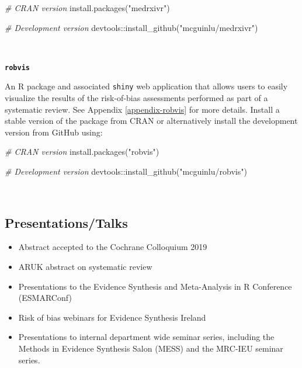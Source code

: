 \documentclass[a4paper, twoside]{templates/ociamthesis}
\providecommand{\tightlist}{%
  \setlength{\itemsep}{0pt}\setlength{\parskip}{0pt}}
\newenvironment{Shaded}{\begin{snugshade}}{\end{snugshade}}
\newcommand{\CommentTok}[1]{\textcolor[rgb]{0.56,0.35,0.01}{\textit{#1}}}
\newcommand{\FunctionTok}[1]{\textcolor[rgb]{0.00,0.00,0.00}{#1}}
\newcommand{\NormalTok}[1]{#1}
\newcommand{\SpecialCharTok}[1]{\textcolor[rgb]{0.00,0.00,0.00}{#1}}
\newcommand{\StringTok}[1]{\textcolor[rgb]{0.31,0.60,0.02}{#1}}
\renewenvironment{Shaded}
{
  \vspace{4pt}%
  \begin{snugshade}%
}{%
  \end{snugshade}%
  \vspace{4pt}%
}
\begin{document}
\begin{Shaded}
\begin{Highlighting}[]
\CommentTok{\# CRAN version}
\FunctionTok{install.packages}\NormalTok{(}\StringTok{"medrxivr"}\NormalTok{)}

\CommentTok{\# Development version}
\NormalTok{devtools}\SpecialCharTok{::}\FunctionTok{install\_github}\NormalTok{(}\StringTok{"mcguinlu/medrxivr"}\NormalTok{)}
\end{Highlighting}
\end{Shaded}

~

\textbf{\texttt{robvis}}

An R package and associated \texttt{shiny} web application that allows users to easily visualize the results of the risk-of-bias assessments performed as part of a systematic review. See Appendix \ref{appendix-robvis} for more details. Install a stable version of the package from CRAN or alternatively install the development version from GitHub using:

\begin{Shaded}
\begin{Highlighting}[]
\CommentTok{\# CRAN version}
\FunctionTok{install.packages}\NormalTok{(}\StringTok{"robvis"}\NormalTok{)}

\CommentTok{\# Development version}
\NormalTok{devtools}\SpecialCharTok{::}\FunctionTok{install\_github}\NormalTok{(}\StringTok{"mcguinlu/robvis"}\NormalTok{)}
\end{Highlighting}
\end{Shaded}

~

\hypertarget{presentationstalks}{%
\subsection{Presentations/Talks}\label{presentationstalks}}

\begin{itemize}
\tightlist
\item
  Abstract accepted to the Cochrane Colloquium 2019
\item
  ARUK abstract on systematic review
\item
  Presentations to the Evidence Synthesis and Meta-Analysis in R Conference (ESMARConf)
\item
  Risk of bias webinars for Evidence Synthesis Ireland
\item
  Presentations to internal department wide seminar series, including the Methods in Evidence Synthesis Salon (MESS) and the MRC-IEU seminar series.
\end{itemize}
\end{document}
